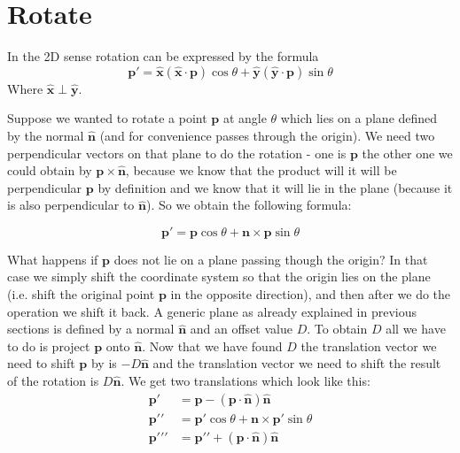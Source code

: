 \documentclass[]{report}   %
\begin{document}
\section{Rotate}


In the 2D sense rotation can be expressed by the formula
\[
	\mathbf{p\prime} = 
	\mathbf{\hat{x}}(\mathbf{\hat{x}} \cdot \mathbf{p})\cos\theta + \mathbf{\hat{y}}(\mathbf{\hat{y}} \cdot \mathbf{p})\sin\theta
\]
Where \(\mathbf{\hat{x}} \perp \mathbf{\hat{y}}\). 

Suppose we wanted to rotate a point \(\mathbf{p}\) at angle \(\theta\) which lies on a plane defined by the normal \(\mathbf{\hat{n}}\) (and for convenience passes through the origin). We need two perpendicular vectors on that plane to do the rotation - one is \(\mathbf{p}\) the other one we could obtain by \(\mathbf{p} \times \mathbf{\hat{n}}\), because we know that the product will it will be perpendicular \(\mathbf{p}\) by definition and we know that it will lie in the plane (because it is also perpendicular to \(\mathbf{\hat{n}}\)). So we obtain the following formula:
\begin{mdframed}
\[
	\mathbf{p\prime} = 
	\mathbf{p}\cos\theta + \mathbf{n}\times\mathbf{p}\sin\theta
\]
\end{mdframed}

What happens if \(\mathbf{p}\) does not lie on a plane passing though the origin? In that case we simply shift the coordinate system so that the origin lies on the plane (i.e. shift the original point \(\mathbf{p}\) in the opposite direction), and then after we do the operation we shift it back. A generic plane as already explained in previous sections is defined by a normal \(\mathbf{\hat{n}}\) and an offset value \(D\). To obtain \(D\) all we have to do is project \(\mathbf{p}\) onto \(\mathbf{\hat{n}}\).
Now that we have found \(D\) the translation vector we need to shift \(\mathbf{p}\) by is \(-D\mathbf{\hat{n}}\) and the translation vector we need to shift the result of the rotation is \(D\mathbf{\hat{n}}\).
We get two translations which look like this:
\begin{align*}
	\mathbf{p\prime} &=  \mathbf{p}-(\mathbf{p}\cdot\mathbf{\hat{n}})\mathbf{\hat{n}} \\
	\mathbf{p\prime\prime} &= \mathbf{p\prime}\cos\theta+\mathbf{n}\times\mathbf{p\prime}\sin\theta	\\
	\mathbf{p\prime\prime\prime} &= \mathbf{p\prime\prime}+(\mathbf{p}\cdot\mathbf{\hat{n}})\mathbf{\hat{n}}
\end{align*}
\end{document}
